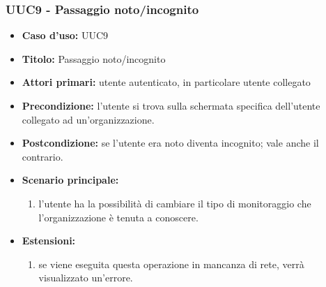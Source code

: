 \documentclass[casi-duso]{subfiles}
\begin{document}
\subsubsection{UUC9 - Passaggio noto/incognito}%
\label{subsub:UUC9utente}
\begin{itemize}
  \item \textbf{Caso d’uso:} UUC9
  \item \textbf{Titolo:} Passaggio noto/incognito
  \item \textbf{Attori primari:} utente autenticato, in particolare utente collegato
  \item \textbf{Precondizione:} l'utente si trova sulla schermata specifica dell'utente collegato ad un'organizzazione.
  \item \textbf{Postcondizione:} se l'utente era noto diventa incognito; vale anche il contrario.
  \item \textbf{Scenario principale:}
        \begin{enumerate}
          \item l'utente ha la possibilità di cambiare il tipo di monitoraggio che l'organizzazione è tenuta a conoscere.
        \end{enumerate}
  \item \textbf{Estensioni:}
        \begin{enumerate}
          \item se viene eseguita questa operazione in mancanza di rete, verrà visualizzato un'errore.
        \end{enumerate}
\end{itemize}

\end{document}
